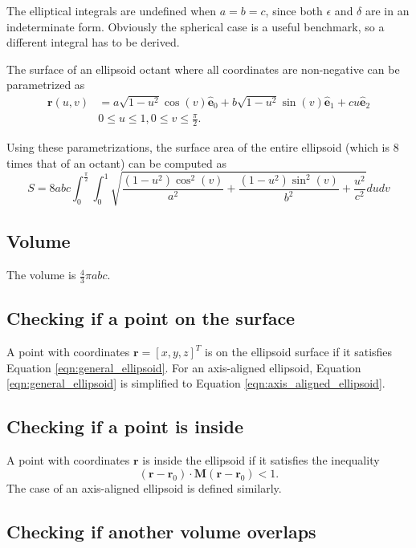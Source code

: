 The elliptical integrals are undefined when $a = b = c$, since both $\epsilon$ and $\delta$ are in an indeterminate form. Obviously the spherical case is a useful benchmark,
so a different integral has to be derived.

The surface of an ellipsoid octant where all coordinates are non-negative can be parametrized as
\begin{align*}
    \bm{r}(u,v) &= a\sqrt{1-u^2} \cos(v) \bm{\hat{e}}_0 + b\sqrt{1-u^2} \sin(v) \bm{\hat{e}}_1 + cu \bm{\hat{e}}_2 \\
    &0 \leq u \leq 1, 0 \leq v \leq \frac{\pi}{2}.
\end{align*}

Using these parametrizations, the surface area of the entire ellipsoid (which is 8 times that of an octant) can be computed as
\begin{equation}
    S = 8abc \int_{0}^{\frac{\pi}{2}} \int_{0}^{1} \sqrt{ \frac{(1-u^2) \cos^2(v)}{a^2} + \frac{(1-u^2) \sin^2(v)}{b^2} + \frac{u^2}{c^2} } du dv
\end{equation}

\subsection{Volume}
The volume is $\displaystyle \frac{4}{3}\pi abc$.

\subsection{Checking if a point on the surface}
A point with coordinates $\bm{r} = [x, y, z]^T$ is on the ellipsoid surface if it satisfies Equation \ref{eqn:general_ellipsoid}. For an axis-aligned ellipsoid, Equation
\ref{eqn:general_ellipsoid} is simplified to Equation \ref{eqn:axis_aligned_ellipsoid}. 

\subsection{Checking if a point is inside}
\label{sect:point_test_ellipsoid}
A point with coordinates $\bm{r}$ is inside the ellipsoid if it satisfies the inequality
$$
    (\bm{r} - \bm{r}_0) \cdot \bm{M}(\bm{r} - \bm{r}_0) < 1.
$$
The case of an axis-aligned ellipsoid is defined similarly.

\subsection{Checking if another volume overlaps}
\label{sect:collision_test_ellipsoid}
